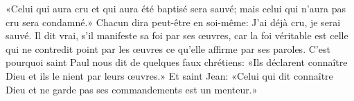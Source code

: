 «Celui qui aura cru et qui aura été baptisé sera sauvé;
	mais celui qui n’aura pas cru sera condamné.»
Chacun dira peut-être en soi-même: J’ai déjà cru, je serai sauvé.
Il dit vrai, s’il manifeste sa foi par ses œuvres,
	car la foi véritable est celle qui ne contredit point par les œuvres
	ce qu’elle affirme par ses paroles.
C’est pourquoi saint Paul nous dit de quelques faux chrétiens:
	«Ils déclarent connaître Dieu et ils le nient par leurs œuvres.»
Et saint Jean: «Celui qui dit connaître Dieu
	et ne garde pas ses commandements
	est un menteur.»
